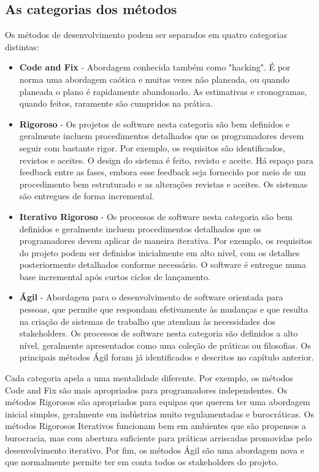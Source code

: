 \subsection{As categorias dos métodos}

Os métodos de desenvolvimento podem ser separados em quatro categorias distintas:

\begin{itemize}
    \item \textbf{Code and Fix} - Abordagem conhecida também como "hacking". É por norma uma abordagem caótica e muitas vezes não planeada, ou quando planeada o plano é rapidamente abandonado. As estimativas e cronogramas, quando feitos, raramente são cumpridos na prática.
    \item \textbf{Rigoroso} - Os projetos de software nesta categoria são bem definidos e geralmente incluem procedimentos detalhados que os programadores devem seguir com bastante rigor. Por exemplo, os requisitos são identificados, revistos e aceites. O design do sistema é feito, revisto e aceite. Há espaço para feedback entre as fases, embora esse feedback seja fornecido por meio de um procedimento bem estruturado e as alterações revistas e aceites. Os sistemas são entregues de forma incremental.
    \item \textbf{Iterativo Rigoroso} - Os processos de software nesta categoria são bem definidos e geralmente incluem procedimentos detalhados que os programadores devem aplicar de maneira iterativa. Por exemplo, os requisitos do projeto podem ser definidos inicialmente em alto nível, com os detalhes posteriormente detalhados conforme necessário. O software é entregue numa base incremental após curtos ciclos de lançamento.
    \item \textbf{Ágil} - Abordagem para o desenvolvimento de software orientada para pessoas, que permite que respondam efetivamente às mudanças e que resulta na criação de sistemas de trabalho que atendam às necessidades dos stakeholders. Os processos de software nesta categoria são definidos a alto nível, geralmente apresentados como uma coleção de práticas ou filosofias. Os principais métodos Ágil foram já identificados e descritos no capítulo anterior.
\end{itemize}

Cada categoria apela a uma mentalidade diferente. Por exemplo, os métodos Code and Fix são mais apropriados para programadores independentes. Os métodos Rigorosos são apropriados para equipas que querem ter uma abordagem inicial simples, geralmente em indústrias muito regulamentadas e burocráticas. Os métodos Rigorosos Iterativos funcionam bem em ambientes que são propensos a burocracia, mas com abertura suficiente para práticas arriscadas promovidas pelo desenvolvimento iterativo. Por fim, os métodos Ágil são uma abordagem nova e que normalmente permite ter em conta todos os stakeholders do projeto.

